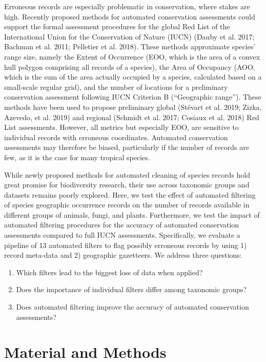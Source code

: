 \documentclass[fleqn,10pt,lineno]{wlpeerj} %
\providecommand{\tightlist}{
\setlength{\itemsep}{0pt}\setlength{\parskip}{0pt}}
\begin{document}
Erroneous records are especially problematic in conservation, where stakes are high. Recently proposed methods for automated conservation assessments could support the formal assessment procedures for the global Red List of the International Union for the Conservation of Nature (IUCN) (Dauby et al. 2017; Bachman et al. 2011; Pelletier et al. 2018). These methods approximate species' range size, namely the Extent of Occurrence (EOO, which is the area of a convex hull polygon comprising all records of a species), the Area of Occupancy (AOO, which is the sum of the area actually occupied by a species, calculated based on a small-scale regular grid), and the number of locations for a preliminary conservation assessment following IUCN Criterion B (``Geographic range''). These methods have been used to propose preliminary global (Stévart et al. 2019; Zizka, Azevedo, et al. 2019) and regional (Schmidt et al. 2017; Cosiaux et al. 2018) Red List assessments. However, all metrics but especially EOO, are sensitive to individual records with erroneous coordinates. Automated conservation assessments may therefore be biased, particularly if the number of records are few, as it is the case for many tropical species.

While newly proposed methods for automated cleaning of species records hold great promise for biodiversity research, their use across taxonomic groups and datasets remains poorly explored. Here, we test the effect of automated filtering of species geographic occurrence records on the number of records available in different groups of animals, fungi, and plants. Furthermore, we test the impact of automated filtering procedures for the accuracy of automated conservation assessments compared to full IUCN assessments. Specifically, we evaluate a pipeline of 13 automated filters to flag possibly erroneous records by using 1) record meta-data and 2) geographic gazetteers. We address three questions:

\begin{enumerate}
\def\labelenumi{\arabic{enumi}.}
\tightlist
\item
  Which filters lead to the biggest loss of data when applied?
\item
  Does the importance of individual filters differ among taxonomic groups?
\item
  Does automated filtering improve the accuracy of automated conservation assessments?
\end{enumerate}

\hypertarget{material-and-methods}{%
\section*{Material and Methods}\label{material-and-methods}}
\end{document}
